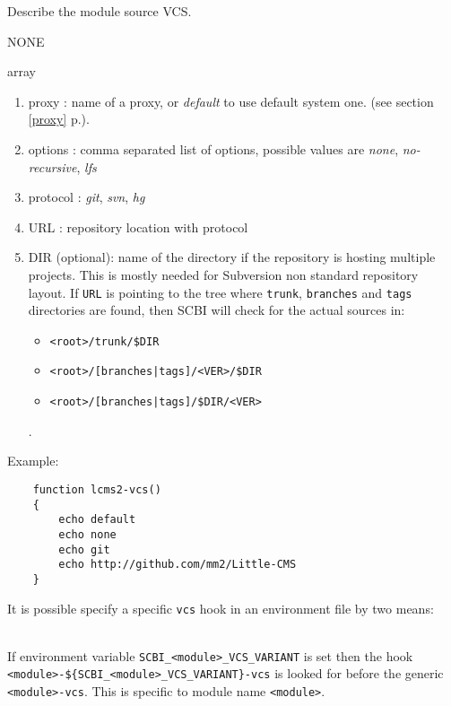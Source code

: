 \documentclass[a4paper,12pt,twoside]{article}
\newcommand{\code}[1]{\texttt{#1}}
\renewcommand{\emph}[1]{\textit{#1}}
\newcommand{\seeref}[1]{see section \ref{#1} p.\pageref{#1}}
\begin{document}
\begin{description}[font=\large\texttt]

	\item[<module>{[}-<variant>{]}-vcs] Describe the module source VCS.
	\begin{description}[font=\textit,style=standard]
		\item[parameter] \tabto{2cm} NONE
		\item[return] \tabto{2cm} array
		\begin{enumerate}
			\item proxy : name of a proxy, or \emph{default} to use default system one. (\seeref{proxy}).
			\item options : comma separated list of options, possible values are \emph{none}, \emph{no-recursive}, \emph{lfs}
			\item protocol : \emph{git}, \emph{svn}, \emph{hg}
			\item URL : repository location with protocol
			\item DIR (optional): name of the directory if the repository is hosting multiple projects. This is mostly needed for Subversion non standard repository layout. If \code{URL} is pointing to the tree where \code{trunk}, \code{branches} and \code{tags} directories are found, then SCBI will check for the actual sources in:
			\begin{itemize}
				\item \code{<root>/trunk/\$DIR}
				\item \code{<root>/[branches|tags]/<VER>/\$DIR}
				\item \code{<root>/[branches|tags]/\$DIR/<VER>}
			\end{itemize}.
		\end{enumerate}
	\end{description}

	Example:
	\begin{lstlisting}
	function lcms2-vcs()
	{
		echo default
		echo none
		echo git
		echo http://github.com/mm2/Little-CMS
	}
	\end{lstlisting}

	It is possible specify a specific \code{vcs} hook in an environment file by two means:

	\begin{description}[style=standard]
		\item[\code{SCBI\_<module>\_VCS\_VARIANT}] \hfill \\
		If environment variable \code{SCBI\_<module>\_VCS\_VARIANT} is set then the hook \\ \code{<module>-\$\{SCBI\_<module>\_VCS\_VARIANT\}-vcs} is looked for before the generic \code{<module>-vcs}. This is specific to module name \code{<module>}.


\end{description}
\end{description}
\end{document}
